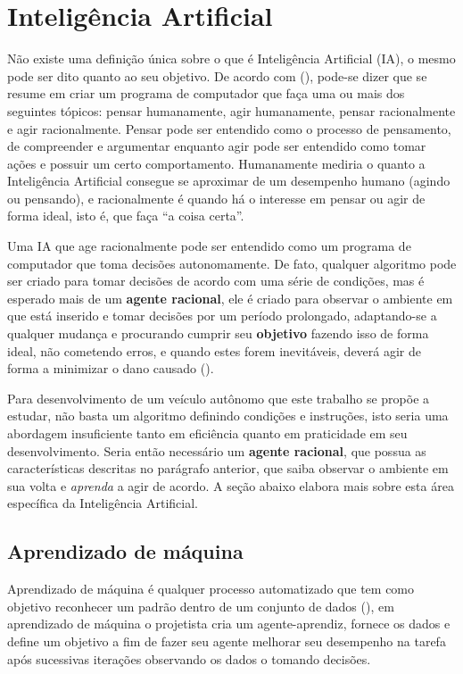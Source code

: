 \section{Inteligência Artificial}
Não existe uma definição única sobre o que é Inteligência Artificial (IA), o mesmo pode ser dito quanto ao seu objetivo. De acordo com (), pode-se dizer que se resume em criar um programa de computador que faça uma ou mais dos seguintes tópicos: pensar humanamente, agir humanamente, pensar racionalmente e agir racionalmente. Pensar pode ser entendido como o processo de pensamento, de compreender e argumentar enquanto agir pode ser entendido como tomar ações e possuir um certo comportamento. Humanamente mediria o quanto a Inteligência Artificial consegue se aproximar de um desempenho humano (agindo ou pensando), e racionalmente é quando há o interesse em pensar ou agir de forma ideal, isto é, que faça ``a coisa certa''.

Uma IA que age racionalmente pode ser entendido como um programa de computador que toma decisões autonomamente. De fato, qualquer algoritmo pode ser criado para tomar decisões de acordo com uma série de condições, mas é esperado mais de um \textbf{agente racional}, ele é criado para observar o ambiente em que está inserido e tomar decisões por um período prolongado, adaptando-se a qualquer mudança e procurando cumprir seu \textbf{objetivo} fazendo isso de forma ideal, não cometendo erros, e quando estes forem inevitáveis, deverá agir de forma a minimizar o dano causado ().

Para desenvolvimento de um veículo autônomo que este trabalho se propõe a estudar, não basta um algoritmo definindo condições e instruções, isto seria uma abordagem insuficiente tanto em eficiência quanto em praticidade em seu desenvolvimento. Seria então necessário um \textbf{agente racional}, que possua as características descritas no parágrafo anterior, que saiba observar o ambiente em sua volta e \textit{aprenda} a agir de acordo. A seção abaixo elabora mais sobre esta área específica da Inteligência Artificial.

\subsection{Aprendizado de máquina}
Aprendizado de máquina é qualquer processo automatizado que tem como objetivo reconhecer um padrão dentro de um conjunto de dados (), em aprendizado de máquina o projetista cria um agente-aprendiz, fornece os dados e define um objetivo a fim de fazer seu agente melhorar seu desempenho na tarefa após sucessivas iterações observando os dados o tomando decisões. 

